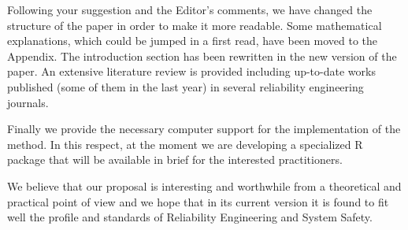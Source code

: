 \documentclass[12pt]{article}
\begin{document}
Following your suggestion and the Editor's comments, we have changed the structure of the paper in order to make it more readable. Some mathematical explanations, which could be jumped in a first read, have been moved to the Appendix.
The introduction section has been rewritten in the new version of the paper. An extensive literature review is provided including up-to-date works published (some of them in the last year) in several reliability engineering journals. 

 Finally we provide the necessary computer support for the implementation of the method. In this respect, at the moment we are developing a specialized R package that will be available in brief for the interested practitioners.



 We believe that our proposal is interesting and worthwhile from a theoretical and practical point of view and we hope that in its current version it is found to fit well the profile and standards of Reliability Engineering and System Safety. 
\end{document}
